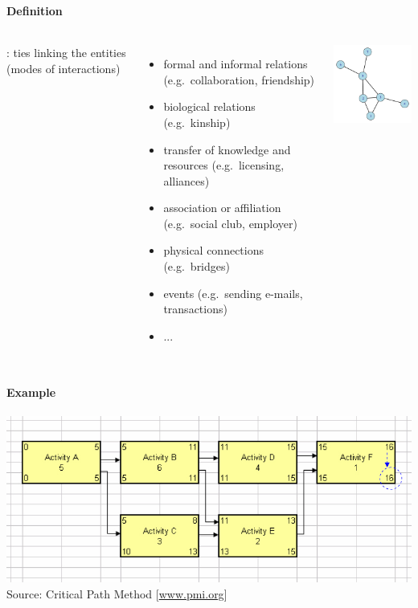 \documentclass[8pt]{beamer}
\begin{document}

\begin{frame}
\frametitle{\insertsection}
\framesubtitle{Definition}

\begin{columns}[c]
{\color{blue}{Links (ties)}}: ties linking the entities (modes of interactions)
	\begin{itemize}
    \item formal and informal relations (e.g.\ collaboration, friendship)
    \item biological relations (e.g.\ kinship)
    \item transfer of knowledge and resources (e.g.\ licensing, alliances)
    \item association or affiliation (e.g.\ social club, employer)
    \item physical connections (e.g.\ bridges)
    \item events (e.g.\ sending e-mails, transactions)
    \item ...
    \end{itemize}

\centering
\includegraphics[width=5cm]{base}
\end{columns}

\end{frame}


\begin{frame}
\frametitle{\insertsection}
\framesubtitle{Example}
\centering
\includegraphics[width=\linewidth,height=0.8\textheight,keepaspectratio]{cpm}\\
\tiny Source: Critical Path Method [\url{www.pmi.org}]
\end{frame}
\end{document}
